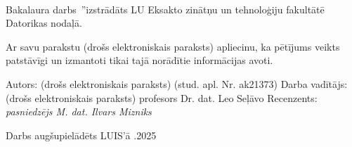 \documentclass[12pt]{report}%
\theoremstyle{definition}
\def\degree{Bakalaura darbs}
\newcommand{\thedate}[0]{26.05.2025}%
\begin{document}
\cleardoublepage
{}
{}
\printbibliography

%
%


\newpage
\thispagestyle{empty}
\makeatletter
{
\setlength{\parindent}{1cm}
\linespread{1.5}
\selectfont
~\\
\newline

\degree \ \quotedblbase\textit{\@title}\textquotedblright \space izstrādāts LU Eksakto zinātņu un tehnoloģiju fakultātē
Datorikas nodaļā.
\newline

Ar savu parakstu (drošs elektroniskais paraksts) apliecinu, ka pētījums veikts
patstāvīgi un izmantoti tikai tajā norādītie informācijas avoti.
\newline

Autors: (drošs elektroniskais paraksts) \@author \space (stud. apl. Nr. ak21373)
\newline
\newline
\newline
\newline
Darba vadītājs: (drošs elektroniskais paraksts) profesors Dr. dat. Leo Seļāvo
\newline
\newline
Recenzents: \textit{pasniedzējs M. dat. Ilvars Mizniks}
\newline
\newline

Darbs augšupielādēts LUIS’ā \qquad \thedate

}
\makeatother
\end{document}
